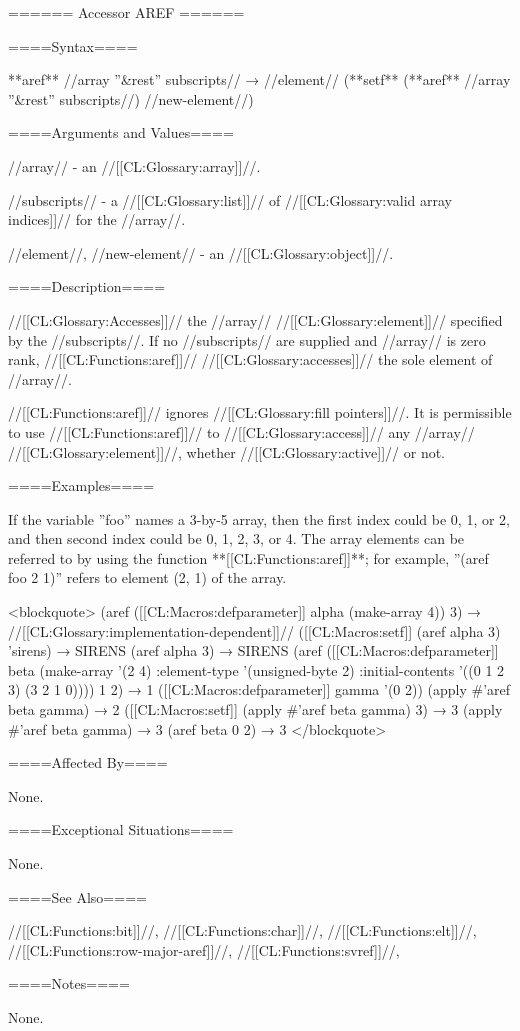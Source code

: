 ====== Accessor AREF ======

====Syntax====

**aref** //array ''&rest'' subscripts// → //element// (**setf** (**aref** //array ''&rest'' subscripts//) //new-element//)

====Arguments and Values====

//array// - an //[[CL:Glossary:array]]//.

//subscripts// - a //[[CL:Glossary:list]]// of //[[CL:Glossary:valid array indices]]// for the //array//.

//element//, //new-element// - an //[[CL:Glossary:object]]//.

====Description====

//[[CL:Glossary:Accesses]]// the //array// //[[CL:Glossary:element]]// specified by the //subscripts//. If no //subscripts// are supplied and //array// is zero rank, //[[CL:Functions:aref]]// //[[CL:Glossary:accesses]]// the sole element of //array//.

//[[CL:Functions:aref]]// ignores //[[CL:Glossary:fill pointers]]//. It is permissible to use //[[CL:Functions:aref]]// to //[[CL:Glossary:access]]// any //array// //[[CL:Glossary:element]]//, whether //[[CL:Glossary:active]]// or not.

====Examples====

If the variable ''foo'' names a 3-by-5 array, then the first index could be 0, 1, or 2, and then second index could be 0, 1, 2, 3, or 4. The array elements can be referred to by using the function **[[CL:Functions:aref]]**; for example, ''(aref foo 2 1)'' refers to element (2, 1) of the array.

<blockquote> (aref ([[CL:Macros:defparameter]] alpha (make-array 4)) 3) → //[[CL:Glossary:implementation-dependent]]// ([[CL:Macros:setf]] (aref alpha 3) 'sirens) → SIRENS (aref alpha 3) → SIRENS (aref ([[CL:Macros:defparameter]] beta (make-array '(2 4) :element-type '(unsigned-byte 2) :initial-contents '((0 1 2 3) (3 2 1 0)))) 1 2) → 1 ([[CL:Macros:defparameter]] gamma '(0 2)) (apply #'aref beta gamma) → 2 ([[CL:Macros:setf]] (apply #'aref beta gamma) 3) → 3 (apply #'aref beta gamma) → 3 (aref beta 0 2) → 3 </blockquote>

====Affected By====

None.

====Exceptional Situations====

None.

====See Also====

//[[CL:Functions:bit]]//, //[[CL:Functions:char]]//, //[[CL:Functions:elt]]//, //[[CL:Functions:row-major-aref]]//, //[[CL:Functions:svref]]//,

{\secref\ConstantModification}

====Notes====

None.

 
